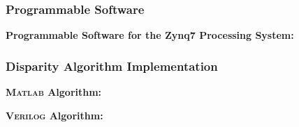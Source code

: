 \newpage

\subsubsection{Programmable Software} \label{ps_code}
\textbf{Programmable Software for the Zynq7 Processing System:}
\singlespacing

\doublespacing

\newpage

\subsubsection{Disparity Algorithm Implementation} \label{disparityTestMatlab}
\textbf{\textsc{Matlab} Algorithm:}
\singlespacing

\doublespacing

\par
\textbf{\textsc{Verilog} Algorithm:}
\singlespacing

\doublespacing






